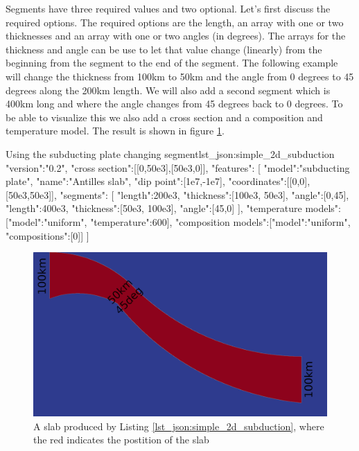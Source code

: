 \documentclass{book}
\begin{document}
Segments have three required values and two optional. Let's first discuss the required options. The required options are the length, an array with one or two thicknesses and an array with one or two angles (in degrees). The arrays for the thickness and angle can be use to let that value change (linearly) from the beginning from the segment to the end of the segment. The following example will change the thickness from 100km to 50km and the angle from 0 degrees to 45 degrees along the 200km length. We will also add a second segment which is 400km long and where the angle changes from 45 degrees back to 0 degrees. To be able to visualize this we also add a cross section and a composition and temperature model. The result is shown in figure \ref{fig:simple_2d_subduction}.

\begin{javascriptcode}{Using the subducting plate changing segment}{lst_json:simple_2d_subduction}
{
  "version":"0.2",
  "cross section":[[0,50e3],[50e3,0]],
  "features":
  [
     {
       "model":"subducting plate", "name":"Antilles slab", "dip point":[1e7,-1e7],
       "coordinates":[[0,0],[50e3,50e3]], 
       "segments":
       [
         {"length":200e3, "thickness":[100e3, 50e3], "angle":[0,45]},
         {"length":400e3, "thickness":[50e3, 100e3], "angle":[45,0]}
       ],
       "temperature models":[{"model":"uniform", "temperature":600}],
       "composition models":[{"model":"uniform", "compositions":[0]}]
    }
  ]
}
\end{javascriptcode}

\begin{figure}
    \centering
    \includegraphics{simple_subducting_plate_example.png}
    \caption{A slab produced by Listing \ref{lst_json:simple_2d_subduction}, where the red indicates the postition of the slab}
    \label{fig:simple_2d_subduction}
\end{figure}
\end{document}
